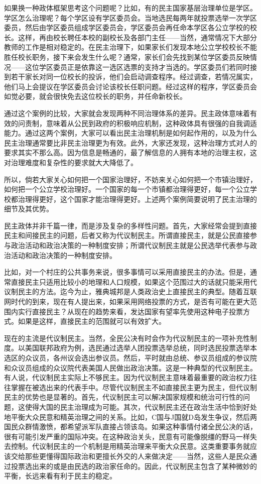 如果换一种政体框架思考这个问题呢？比如，有的民主国家基层治理单位是学区。学区怎么治理呢？每个学区设有学区委员会。当地选民每两年就投票选举一次学区委员，然后由学区委员组成学区委员会，学区委员会再任命本学区各公立学校的校长。这样，再由校长聘任本校的副校长及各部门主任——当然，通常情况下大部分教师的工作是相对稳定的。在民主治理下，如果家长们发现本地公立学校校长不能胜任校长职务，接下来会发生什么呢？通常，家长们会先找到某位学区委员反映情况——这位学区委员正是依靠这一选区选票的支持才当选的。学区委员们若同时接到若干家长对同一位校长的投诉，他们会启动调查程序。经过调查，若情况属实，他们马上会提议在学区委员会讨论该校长任职问题。经过这样的程序，学区委员会如觉必要，就会很快免去这位校长的职务，并任命新校长。

通过这个案例的比较，大家就会发现两种不同治理体系的差异。民主政体意味着有效的问责制，意味着从公民到政府的积极响应机制，这种政体具有很强的自我调适能力。通过这两个案例，大家可以看出民主治理机制是如何起作用的，以及为什么民主治理通常要比非民主治理更为有效。此外，大家还发现，这种治理方式对人的要求其实不那么高。因为信息是畅通的，最了解信息的人拥有本地的治理主权，这对治理难度和复杂性的要求就大大降低了。

所以，倘若大家关心如何把一个国家治理好，不妨来关心如何把一个市镇治理好，如何把一个公立学校治理好。一个国家的每一个市镇都治理得更好，每一个公立学校都治理得更好，这个国家才能治理得更好。上述两个案例简要说明了民主治理的细节及其优势。


民主政体并非千篇一律，而是涉及复杂的多样性问题。首先，大家经常会提到直接民主和间接民主的问题，后者又称为代议制民主。所谓直接民主，就是公民直接参与政治活动和政治决策的一种制度安排；所谓代议制民主就是公民选举代表参与政治活动和政治决策的一种制度安排。

比如，对一个村庄的公共事务来说，很多事情可以采用直接民主的办法。但是，通常直接民主只适用比较小的地理和人口规模，如果这个范围过大的话就只能采用代议制民主的方法。迄今为止，雅典城邦是人类政治史上直接民主的典型。随着互联网时代的到来，现在有人提出来，如果采用网络投票的方式，是否有可能在更大范围内实行直接民主？从现在的趋势来看，发达国家有望率先使用这种电子投票方式。如果是这样，直接民主的范围就可以有效扩大。

现在的主流是代议制民主。当然，全民公决有时会作为代议制民主的一项补充性制度。以美国联邦政府为例，选民通过选举人团投票选举总统，同时选民投票选举本选区的众议员，各州议会选出参议员。然后，平时就由总统、参议员组成的参议院和众议员组成的众议院代表美国人民做出政治决策。这是一种典型的代议制民主。有人说，代议制民主实际上不够民主。因为代议制民主意味着最重要的政治权力往往掌握在被选出来的代表手中。尽管代议制民主不如直接民主更为民主，但代议制民主的优势也是显著的。首先，代议制民主可以解决国家规模和统治可行性的问题，这使得大国的民主治理成为可能。其次，代议制民主还在政治生活中恰到好处地平衡大众民意和精英治理之间的关系。比如，C国与J国就D岛发生争议，然后两国民众群情激愤，都希望派军队直接占领该岛。如果这种事情付诸全民公决的话，很有可能引发严重的国际冲突。在这种政治关头，民意有可能像脱缰的野马一样失去控制。代议制民主的一个机制是用精英治理来平衡大众民意。这类重要事务就应该交给那些更懂得国际政治和更擅长外交的人来做决定——当然，这些人是民众通过投票选出来的或是由民选的政治家任命的。因此，代议制民主包含了某种微妙的平衡，长远来看有利于民主的稳定。

